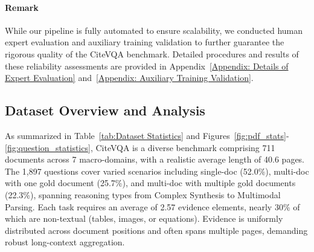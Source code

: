 \documentclass[]{opendatalab}
\begin{document}
{\paragraph{Remark} While our pipeline is fully automated to ensure scalability, we conducted human expert evaluation and auxiliary training validation to further guarantee the rigorous quality of the CiteVQA benchmark. Detailed procedures and results of these reliability assessments are provided in Appendix~\ref{Appendix: Details of Expert Evaluation} and~\ref{Appendix: Auxiliary Training Validation}.

\subsection{Dataset Overview and Analysis}
As summarized in Table~\ref{tab:Dataset Statistics} and Figures~\ref{fig:pdf_stats}-\ref{fig:question_statistics}, CiteVQA is a diverse benchmark comprising 711 documents across 7 macro-domains, with a realistic average length of 40.6 pages. The 1,897 questions cover varied scenarios including single-doc (52.0\%), multi-doc with one gold document (25.7\%), and multi-doc with multiple gold documents (22.3\%), spanning reasoning types from Complex Synthesis to Multimodal Parsing. Each task requires an average of 2.57 evidence elements, nearly 30\% of which are non-textual (tables, images, or equations). Evidence is uniformly distributed across document positions and often spans multiple pages, demanding robust long-context aggregation.

}
\end{document}

